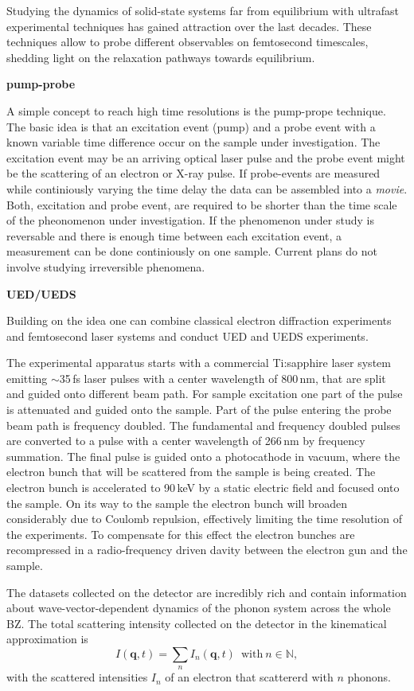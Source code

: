 Studying the dynamics of solid-state systems far from equilibrium with ultrafast experimental techniques has gained attraction over the last decades.
These techniques allow to probe different observables on femtosecond timescales, shedding light on the relaxation pathways towards equilibrium.

\textbf{pump-probe}

A simple concept to reach high time resolutions is the pump-prope technique.
The basic idea is that an excitation event (pump) and a probe event with a known variable time difference occur on the sample under investigation.
The excitation event may be an arriving optical laser pulse and the probe event might be the scattering of an electron or X-ray pulse.
If probe-events are measured while continiously varying the time delay the data can be assembled into a \emph{movie}.
Both, excitation and probe event, are required to be shorter than the time scale of the pheonomenon under investigation.
If the phenomenon under study is reversable and there is enough time between each excitation event, a measurement can be done continiously on one sample.
Current plans do not involve studying irreversible phenomena.

\textbf{UED/UEDS}

Building on the idea one can combine classical electron diffraction experiments and femtosecond laser systems and conduct \ac{UED} and \ac{UEDS} experiments.

The experimental apparatus starts with a commercial Ti:sapphire laser system emitting $\sim$35\,fs laser pulses with a center wavelength of 800\,nm, that are split and guided onto different beam path.
For sample excitation one part of the pulse is attenuated and guided onto the sample.
Part of the pulse entering the probe beam path is frequency doubled. The fundamental and frequency doubled pulses are converted to a pulse with a center wavelength of 266\,nm by frequency summation.
The final pulse is guided onto a photocathode in vacuum, where the electron bunch that will be scattered from the sample is being created.
The electron bunch is accelerated to 90\,keV by a static electric field and focused onto the sample.
On its way to the sample the electron bunch will broaden considerably due to Coulomb repulsion, effectively limiting the time resolution of the experiments.
To compensate for this effect the electron bunches are recompressed in a radio-frequency driven davity between the electron gun and the sample.

The datasets collected on the detector are incredibly rich and contain information about wave-vector-dependent dynamics of the phonon system across the whole \ac{BZ}.
The total scattering intensity collected on the detector in the kinematical approximation is
\[ I(\mathbf{q},t) = \sum_n I_n(\mathbf{q},t)\enspace\text{with}\ n \in\mathbb{N},\]
with the scattered intensities $I_n$ of an electron that scattererd with $n$ phonons.


